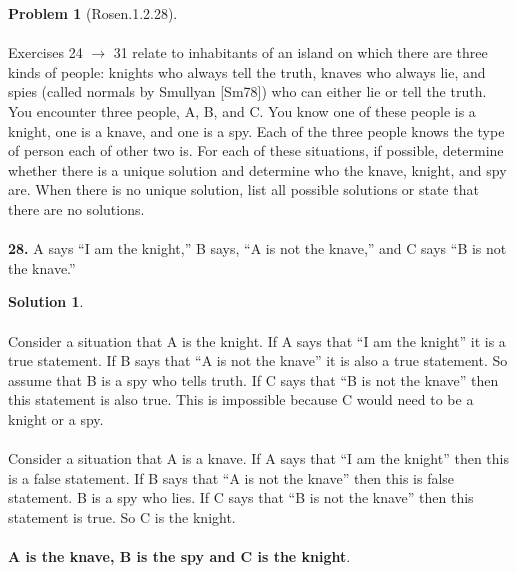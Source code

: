\documentclass{article}
\theoremstyle{definition}
\newtheorem*{problem}{Problem}
\newtheorem*{solution}{Solution}
\begin{document}
\begin{problem}[Rosen.1.2.28]\ \\
\ \\
Exercises 24 $\rightarrow$ 31 relate to inhabitants of an island on which
there are three kinds of people: knights who always tell the
truth, knaves who always lie, and spies (called normals by
Smullyan [Sm78]) who can either lie or tell the truth. You
encounter three people, A, B, and C. You know one of these
people is a knight, one is a knave, and one is a spy. Each of the
three people knows the type of person each of other two is. For
each of these situations, if possible, determine whether there
is a unique solution and determine who the knave, knight, and
spy are. When there is no unique solution, list all possible
solutions or state that there are no solutions.\ \\
\ \\
\textbf{28.} A says “I am the knight,” B says, “A is not the knave,”
and C says “B is not the knave.”
\begin{compactenum}
\renewcommand{\theenumi}{\alph{enumi}}

\end{compactenum}
\end{problem}

\begin{solution}\ \\
\ \\
Consider a situation that A is the knight. If A says that “I am the knight” it is a true statement. If B says that “A is not the knave” it is also a true statement. So assume that B is a spy who tells truth. If C says that “B is not the knave” then this statement is also true. This is impossible because C would need to be a knight or a spy.\ \\
\ \\
Consider a situation that A is a knave. If A says that “I am the knight” then this is a false statement. If B says that “A is not the knave” then this is false statement. B is a spy who lies. If C says that “B is not the knave” then this statement is true. So C is the knight.\ \\
\ \\
\textbf{A is the knave, B is the spy and C is the knight}.





\begin{compactenum}
\renewcommand{\theenumi}{\alph{enumi}}


\end{compactenum}
\end{solution}
\end{document}
